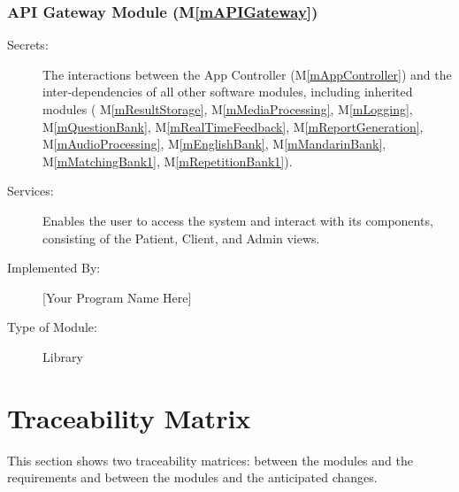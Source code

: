 \documentclass[12pt, titlepage]{article}
\newcommand{\mref}[1]{M\ref{#1}}
\begin{document}
    \subsubsection{API Gateway Module (\mref{mAPIGateway})}
  
    \begin{description}
      \item[Secrets:]The interactions between the App Controller (\mref{mAppController}) and the inter-dependencies of all other software modules, including inherited modules (
      \mref{mResultStorage},
      \mref{mMediaProcessing},
      \mref{mLogging},
      \mref{mQuestionBank},
      \mref{mRealTimeFeedback},
      \mref{mReportGeneration},
      \mref{mAudioProcessing},
      \mref{mEnglishBank},
      \mref{mMandarinBank},
      \mref{mMatchingBank1},
      \mref{mRepetitionBank1}).
      \item[Services:]Enables the user to access the system and interact with its components, consisting of the Patient, Client, and Admin views.
      \item[Implemented By:] [Your Program Name Here]
      \item[Type of Module:] Library
      \end{description}

\section{Traceability Matrix} \label{SecTM}

This section shows two traceability matrices: between the modules and the
requirements and between the modules and the anticipated changes.
\end{document}
